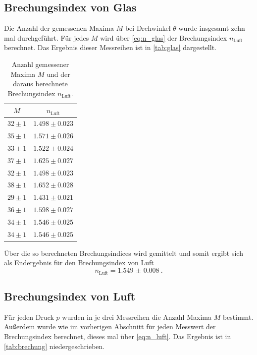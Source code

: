 \subsection{Brechungsindex von Glas}
Die Anzahl der gemessenen Maxima $M$ bei Drehwinkel $\theta$ wurde insgesamt zehn mal durchgeführt.
Für jedes $M$ wird über \autoref{eq:n_glas} der Brechungsindex $n_\text{Luft}$ berechnet.
Das Ergebnis dieser Messreihen ist in \autoref{tab:glas} dargestellt.
\begin{table}
    \centering
    \caption{Anzahl gemessener Maxima $M$ und der daraus berechnete Brechungsindex $n_\text{Luft}$.}
    \label{tab:glas}
    \begin{tabular}{c c}
        \toprule
        $M$ & $n_\text{Luft}$ \\
        \midrule
        $32 \pm 1 $ & $1.498 \pm 0.023 $ \\
        $35 \pm 1 $ & $1.571 \pm 0.026 $ \\
        $33 \pm 1 $ & $1.522 \pm 0.024 $ \\
        $37 \pm 1 $ & $1.625 \pm 0.027 $ \\
        $32 \pm 1 $ & $1.498 \pm 0.023 $ \\
        $38 \pm 1 $ & $1.652 \pm 0.028 $ \\
        $29 \pm 1 $ & $1.431 \pm 0.021 $ \\
        $36 \pm 1 $ & $1.598 \pm 0.027 $ \\
        $34 \pm 1 $ & $1.546 \pm 0.025 $ \\
        $34 \pm 1 $ & $1.546 \pm 0.025 $ \\
        \bottomrule
    \end{tabular}
\end{table}
Über die so berechneten Brechungsindices wird gemittelt und somit ergibt sich als Endergebnis für den Brechungsindex von Luft
\begin{equation*}
    n_\text{Luft} = \qty{1.549(8)}{}.
\end{equation*}

\subsection{Brechungsindex von Luft}
Für jeden Druck $p$ wurden in je drei Messreihen die Anzahl Maxima $M$ bestimmt.
Außerdem wurde wie im vorherigen Abschnitt für jeden Messwert der Brechungsindex berechnet, dieses mal über \autoref{eq:n_luft}.
Das Ergebnis ist in \autoref{tab:brechung} niedergeschrieben.

